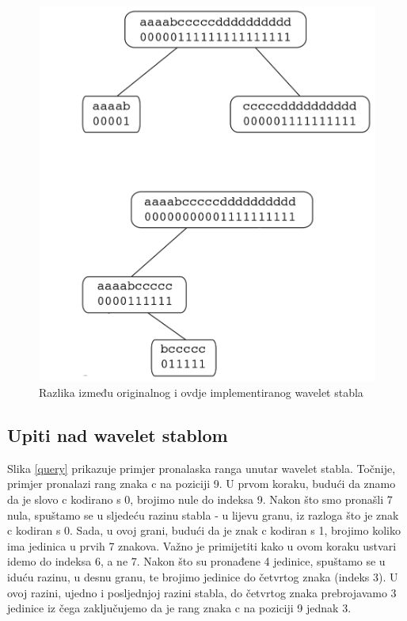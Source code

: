 \begin{figure}[H]
\centering
\includegraphics[scale=0.2]{./pictures/Waveletusporedba.jpg}
\caption{Razlika između originalnog i ovdje implementiranog wavelet stabla}\label{usporedba}
\end{figure}



\subsection{Upiti nad wavelet stablom}
Slika \ref{query} prikazuje primjer pronalaska ranga unutar wavelet stabla. Točnije, primjer pronalazi rang znaka c na poziciji 9. U prvom koraku, budući da znamo da je slovo c kodirano s 0, brojimo nule do indeksa 9. Nakon što smo pronašli 7 nula, spuštamo se u sljedeću razinu stabla - u lijevu granu, iz razloga što je znak c kodiran s 0. Sada, u ovoj grani, budući da je znak c kodiran s 1, brojimo koliko ima jedinica u prvih 7 znakova. Važno je primijetiti kako u ovom koraku ustvari idemo do indeksa 6, a ne 7. Nakon što su pronađene 4 jedinice, spuštamo se u iduću razinu, u desnu granu, te brojimo jedinice do četvrtog znaka (indeks 3). U ovoj razini, ujedno i posljednjoj razini stabla, do četvrtog znaka prebrojavamo 3 jedinice iz čega zaključujemo da je rang znaka c na poziciji 9 jednak 3.

